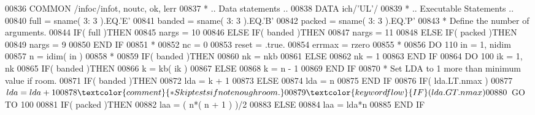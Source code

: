 \begin{DoxyCode}
00836       \textcolor{keyword}{COMMON}             /infoc/infot, noutc, ok, lerr
00837 \textcolor{comment}{*     .. Data statements ..}
00838       \textcolor{keyword}{DATA}               ich/\textcolor{stringliteral}{'UL'}/
00839 \textcolor{comment}{*     .. Executable Statements ..}
00840       full = sname( 3: 3 ).EQ.\textcolor{stringliteral}{'E'}
00841       banded = sname( 3: 3 ).EQ.\textcolor{stringliteral}{'B'}
00842       packed = sname( 3: 3 ).EQ.\textcolor{stringliteral}{'P'}
00843 \textcolor{comment}{*     Define the number of arguments.}
00844       \textcolor{keywordflow}{IF}( full )\textcolor{keywordflow}{THEN}
00845          nargs = 10
00846       \textcolor{keywordflow}{ELSE} \textcolor{keywordflow}{IF}( banded )\textcolor{keywordflow}{THEN}
00847          nargs = 11
00848       \textcolor{keywordflow}{ELSE} \textcolor{keywordflow}{IF}( packed )\textcolor{keywordflow}{THEN}
00849          nargs = 9
00850 \textcolor{keywordflow}{      END IF}
00851 \textcolor{comment}{*}
00852       nc = 0
00853       reset = .true.
00854       errmax = rzero
00855 \textcolor{comment}{*}
00856       \textcolor{keywordflow}{DO} 110 in = 1, nidim
00857          n = idim( in )
00858 \textcolor{comment}{*}
00859          \textcolor{keywordflow}{IF}( banded )\textcolor{keywordflow}{THEN}
00860             nk = nkb
00861          \textcolor{keywordflow}{ELSE}
00862             nk = 1
00863 \textcolor{keywordflow}{         END IF}
00864          \textcolor{keywordflow}{DO} 100 ik = 1, nk
00865             \textcolor{keywordflow}{IF}( banded )\textcolor{keywordflow}{THEN}
00866                k = kb( ik )
00867             \textcolor{keywordflow}{ELSE}
00868                k = n - 1
00869 \textcolor{keywordflow}{            END IF}
00870 \textcolor{comment}{*           Set LDA to 1 more than minimum value if room.}
00871             \textcolor{keywordflow}{IF}( banded )\textcolor{keywordflow}{THEN}
00872                lda = k + 1
00873             \textcolor{keywordflow}{ELSE}
00874                lda = n
00875 \textcolor{keywordflow}{            END IF}
00876             \textcolor{keywordflow}{IF}( lda.LT.nmax )
00877      $         lda = lda + 1
00878 \textcolor{comment}{*           Skip tests if not enough room.}
00879             \textcolor{keywordflow}{IF}( lda.GT.nmax )
00880      $         \textcolor{keywordflow}{GO TO} 100
00881             \textcolor{keywordflow}{IF}( packed )\textcolor{keywordflow}{THEN}
00882                laa = ( n*( n + 1 ) )/2
00883             \textcolor{keywordflow}{ELSE}
00884                laa = lda*n
00885 \textcolor{keywordflow}{            END IF}

\end{DoxyCode}
